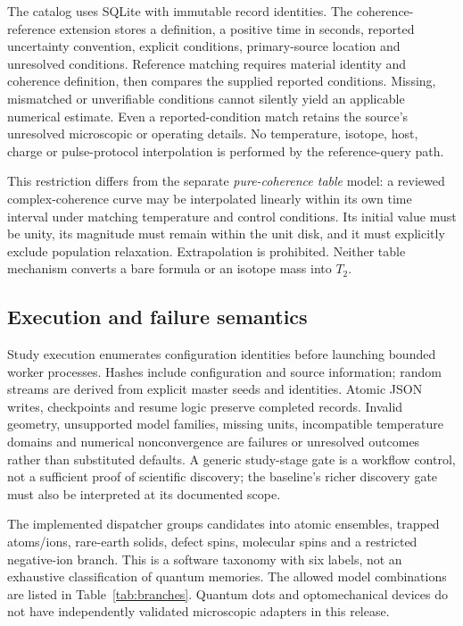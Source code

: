 \documentclass[11pt,a4paper]{article}
\begin{document}
The catalog uses SQLite with immutable record identities. The coherence-reference extension stores a definition, a positive time in seconds, reported uncertainty convention, explicit conditions, primary-source location and unresolved conditions. Reference matching requires material identity and coherence definition, then compares the supplied reported conditions. Missing, mismatched or unverifiable conditions cannot silently yield an applicable numerical estimate. Even a reported-condition match retains the source's unresolved microscopic or operating details. No temperature, isotope, host, charge or pulse-protocol interpolation is performed by the reference-query path.

This restriction differs from the separate \emph{pure-coherence table} model: a reviewed complex-coherence curve may be interpolated linearly within its own time interval under matching temperature and control conditions. Its initial value must be unity, its magnitude must remain within the unit disk, and it must explicitly exclude population relaxation. Extrapolation is prohibited. Neither table mechanism converts a bare formula or an isotope mass into $T_2$.

\subsection{Execution and failure semantics}
Study execution enumerates configuration identities before launching bounded worker processes. Hashes include configuration and source information; random streams are derived from explicit master seeds and identities. Atomic JSON writes, checkpoints and resume logic preserve completed records. Invalid geometry, unsupported model families, missing units, incompatible temperature domains and numerical nonconvergence are failures or unresolved outcomes rather than substituted defaults. A generic study-stage gate is a workflow control, not a sufficient proof of scientific discovery; the baseline's richer discovery gate must also be interpreted at its documented scope.

The implemented dispatcher groups candidates into atomic ensembles, trapped atoms/ions, rare-earth solids, defect spins, molecular spins and a restricted negative-ion branch. This is a software taxonomy with six labels, not an exhaustive classification of quantum memories. The allowed model combinations are listed in Table~\ref{tab:branches}. Quantum dots and optomechanical devices do not have independently validated microscopic adapters in this release.
\end{document}
